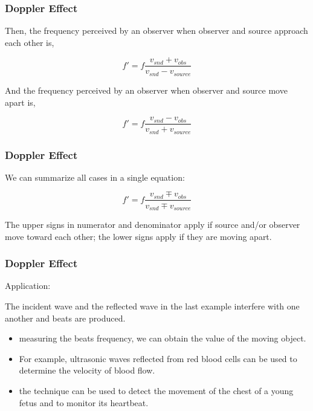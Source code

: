 \documentclass[]{beamer}
\begin{document}

\begin{frame}
\frametitle{Doppler Effect}

Then, the frequency perceived by an observer when observer and source approach each other is,

\begin{equation}
f'=f \frac{v_{snd}+v_{obs}}{v_{snd}-v_{source}}
\end{equation}

\pause

And the frequency perceived  by an observer when observer and source move apart is,

\begin{equation}
f'=f \frac{v_{snd}-v_{obs}}{v_{snd}+v_{source}}
\end{equation}


  \end{frame}


\begin{frame}
\frametitle{Doppler Effect}

We can summarize all cases in a single equation:

\begin{equation}
f'=f \frac{v_{snd}\mp  v_{obs}}{v_{snd}\mp v_{source}}
\end{equation}

\pause

The upper signs in numerator and denominator apply if
source and/or observer move toward each other; the lower signs apply if they are
moving apart.

  \end{frame}


\begin{frame}
\frametitle{Doppler Effect}

Application:
\pause

\vspace{3mm}


The incident wave and the reflected wave in the last example interfere with one another and beats are produced.
\pause

\begin{itemize}
\item measuring the beats frequency, we can obtain the value of the moving object.
\pause
\item  For example, ultrasonic waves
reflected from red blood cells can be used to determine the velocity of blood flow.
\pause
\item the technique can be used to detect the movement of the chest of a
young fetus and to monitor its heartbeat.
\end{itemize}


  \end{frame}
\end{document}
